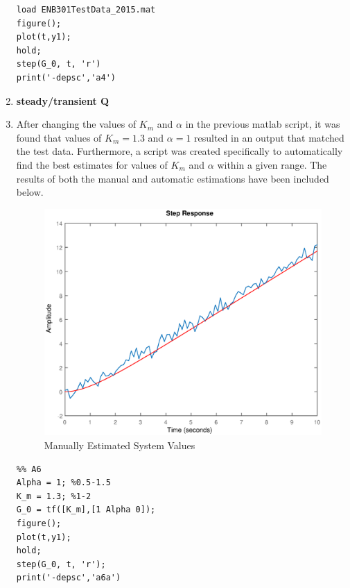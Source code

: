\documentclass[11pt,a4paper]{article}
\begin{document}
\begin{enumerate}
\begin{lstlisting}
load ENB301TestData_2015.mat
figure();
plot(t,y1);
hold;
step(G_0, t, 'r')
print('-depsc','a4')
	\end{lstlisting}
  
  
  
  
  
    \item \textbf{steady/transient Q}
    
    
    
    
    \pagebreak
    \item After changing the values of $K_m$ and $\alpha$ in the previous matlab script, it was found that values of $K_m = 1.3$ and $\alpha = 1$ resulted in an output that matched the test data. Furthermore, a script was created specifically to automatically find the best estimates for values of $K_m$ and $\alpha$ within a given range. The results of both the manual and automatic estimations have been included below. 
    \begin{figure}[H]
	\centering
	\includegraphics[width=.8\textwidth]{PreLach/a6a.eps}
	\caption{\label{fig:manest}Manually Estimated System Values}
	\end{figure}
    \begin{lstlisting}
%% A6
Alpha = 1; %0.5-1.5
K_m = 1.3; %1-2
G_0 = tf([K_m],[1 Alpha 0]);
figure();
plot(t,y1);
hold;
step(G_0, t, 'r');
print('-depsc','a6a')
	\end{lstlisting}
    

\end{enumerate}
\end{document}
